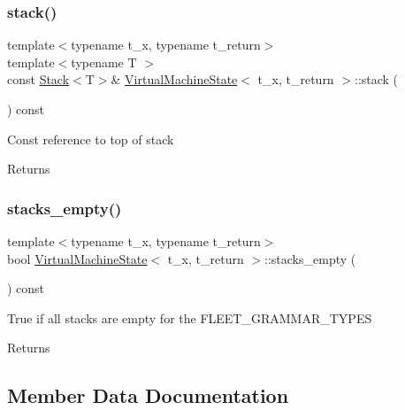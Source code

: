 \subsubsection{\texorpdfstring{stack()}{stack()}\hspace{0.1cm}{\footnotesize\ttfamily [2/2]}}
{\footnotesize\ttfamily template$<$typename t\+\_\+x, typename t\+\_\+return$>$ \\
template$<$typename T $>$ \\
const \hyperlink{class_stack}{Stack}$<$T$>$\& \hyperlink{class_virtual_machine_state}{Virtual\+Machine\+State}$<$ t\+\_\+x, t\+\_\+return $>$\+::stack (\begin{DoxyParamCaption}{ }\end{DoxyParamCaption}) const\hspace{0.3cm}{\ttfamily [inline]}}

Const reference to top of stack \begin{DoxyReturn}{Returns}

\end{DoxyReturn}
\mbox{\label{class_virtual_machine_state_aa9290fe5ec7bc78a3b57c9623c856f32}} 
\subsubsection{\texorpdfstring{stacks\+\_\+empty()}{stacks\_empty()}}
{\footnotesize\ttfamily template$<$typename t\+\_\+x, typename t\+\_\+return$>$ \\
bool \hyperlink{class_virtual_machine_state}{Virtual\+Machine\+State}$<$ t\+\_\+x, t\+\_\+return $>$\+::stacks\+\_\+empty (\begin{DoxyParamCaption}{ }\end{DoxyParamCaption}) const\hspace{0.3cm}{\ttfamily [inline]}}

True if all stacks are empty for the F\+L\+E\+E\+T\+\_\+\+G\+R\+A\+M\+M\+A\+R\+\_\+\+T\+Y\+P\+ES \begin{DoxyReturn}{Returns}

\end{DoxyReturn}


\subsection{Member Data Documentation}
\mbox{\label{class_virtual_machine_state_a6a5b8666e3c3a5d8b951abd6ba876c39}} 
